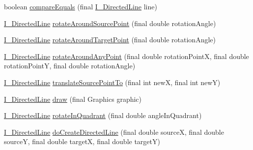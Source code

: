 \begin{DoxyCompactItemize}
\item 
boolean \hyperlink{interfaceorg_1_1tzi_1_1use_1_1gui_1_1views_1_1diagrams_1_1util_1_1_i___directed_line_a576cf46f2b40f4937399e2d2dde06297}{compare\-Equals} (final \hyperlink{interfaceorg_1_1tzi_1_1use_1_1gui_1_1views_1_1diagrams_1_1util_1_1_i___directed_line}{I\-\_\-\-Directed\-Line} line)
\item 
\hyperlink{interfaceorg_1_1tzi_1_1use_1_1gui_1_1views_1_1diagrams_1_1util_1_1_i___directed_line}{I\-\_\-\-Directed\-Line} \hyperlink{interfaceorg_1_1tzi_1_1use_1_1gui_1_1views_1_1diagrams_1_1util_1_1_i___directed_line_aa284d713792fc6d2f5ce21a241ebb79f}{rotate\-Around\-Source\-Point} (final double rotation\-Angle)
\item 
\hyperlink{interfaceorg_1_1tzi_1_1use_1_1gui_1_1views_1_1diagrams_1_1util_1_1_i___directed_line}{I\-\_\-\-Directed\-Line} \hyperlink{interfaceorg_1_1tzi_1_1use_1_1gui_1_1views_1_1diagrams_1_1util_1_1_i___directed_line_a497a39180379bcf32386db236b2d6e65}{rotate\-Around\-Target\-Point} (final double rotation\-Angle)
\item 
\hyperlink{interfaceorg_1_1tzi_1_1use_1_1gui_1_1views_1_1diagrams_1_1util_1_1_i___directed_line}{I\-\_\-\-Directed\-Line} \hyperlink{interfaceorg_1_1tzi_1_1use_1_1gui_1_1views_1_1diagrams_1_1util_1_1_i___directed_line_aae2feb98949478ad7b3e51aeb922e956}{rotate\-Around\-Any\-Point} (final double rotation\-Point\-X, final double rotation\-Point\-Y, final double rotation\-Angle)
\item 
\hyperlink{interfaceorg_1_1tzi_1_1use_1_1gui_1_1views_1_1diagrams_1_1util_1_1_i___directed_line}{I\-\_\-\-Directed\-Line} \hyperlink{interfaceorg_1_1tzi_1_1use_1_1gui_1_1views_1_1diagrams_1_1util_1_1_i___directed_line_a1894c5cdc61cbd359f2e448f03ef76a0}{translate\-Source\-Point\-To} (final int new\-X, final int new\-Y)
\item 
\hyperlink{interfaceorg_1_1tzi_1_1use_1_1gui_1_1views_1_1diagrams_1_1util_1_1_i___directed_line}{I\-\_\-\-Directed\-Line} \hyperlink{interfaceorg_1_1tzi_1_1use_1_1gui_1_1views_1_1diagrams_1_1util_1_1_i___directed_line_a441d35e47cbe46520c307577701d5927}{draw} (final Graphics graphic)
\item 
\hyperlink{interfaceorg_1_1tzi_1_1use_1_1gui_1_1views_1_1diagrams_1_1util_1_1_i___directed_line}{I\-\_\-\-Directed\-Line} \hyperlink{interfaceorg_1_1tzi_1_1use_1_1gui_1_1views_1_1diagrams_1_1util_1_1_i___directed_line_adbc2c670653bd0937d8255589365464d}{rotate\-In\-Quadrant} (final double angle\-In\-Quadrant)
\item 
\hyperlink{interfaceorg_1_1tzi_1_1use_1_1gui_1_1views_1_1diagrams_1_1util_1_1_i___directed_line}{I\-\_\-\-Directed\-Line} \hyperlink{interfaceorg_1_1tzi_1_1use_1_1gui_1_1views_1_1diagrams_1_1util_1_1_i___directed_line_a8cb1a1610d7fce4abe9da78da8aa82ca}{do\-Create\-Directed\-Line} (final double source\-X, final double source\-Y, final double target\-X, final double target\-Y)
\end{DoxyCompactItemize}


